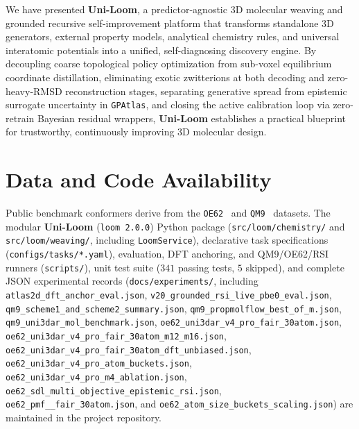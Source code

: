 \documentclass[11pt,a4paper]{article}
\begin{document}
We have presented \textbf{Uni-Loom}, a predictor-agnostic 3D molecular weaving and grounded recursive self-improvement platform that transforms standalone 3D generators, external property models, analytical chemistry rules, and universal interatomic potentials into a unified, self-diagnosing discovery engine. By decoupling coarse topological policy optimization from sub-voxel equilibrium coordinate distillation, eliminating exotic zwitterions at both decoding and zero-heavy-RMSD reconstruction stages, separating generative spread from epistemic surrogate uncertainty in \texttt{GPAtlas}, and closing the active calibration loop via zero-retrain Bayesian residual wrappers, \textbf{Uni-Loom} establishes a practical blueprint for trustworthy, continuously improving 3D molecular design.

\section*{Data and Code Availability}
{\sloppy
Public benchmark conformers derive from the \texttt{OE62}~\cite{stuke2020oe62} and \texttt{QM9}~\cite{ramakrishnan2014qm9} datasets. The modular \textbf{Uni-Loom} (\texttt{loom 2.0.0}) Python package (\texttt{src/loom/\allowbreak chemistry/} and \texttt{src/loom/\allowbreak weaving/}, including \texttt{LoomService}), declarative task specifications (\texttt{configs/\allowbreak tasks/*.yaml}), evaluation, DFT anchoring, and QM9/OE62/RSI runners (\texttt{scripts/}), unit test suite ($341$ passing tests, $5$ skipped), and complete JSON experimental records (\texttt{docs/\allowbreak experiments/}, including \texttt{atlas2d\_\allowbreak dft\_\allowbreak anchor\_\allowbreak eval.json}, \texttt{v20\_\allowbreak grounded\_\allowbreak rsi\_\allowbreak live\_\allowbreak pbe0\_\allowbreak eval.json}, \texttt{qm9\_\allowbreak scheme1\_\allowbreak and\_\allowbreak scheme2\_\allowbreak summary.json}, \texttt{qm9\_\allowbreak propmolflow\_\allowbreak best\_\allowbreak of\_\allowbreak m.json}, \texttt{qm9\_\allowbreak uni3dar\_\allowbreak mol\_\allowbreak benchmark.json}, \texttt{oe62\_\allowbreak uni3dar\_\allowbreak v4\_\allowbreak pro\_\allowbreak fair\_\allowbreak 30atom.json}, \texttt{oe62\_\allowbreak uni3dar\_\allowbreak v4\_\allowbreak pro\_\allowbreak fair\_\allowbreak 30atom\_\allowbreak m12\_\allowbreak m16.json}, \texttt{oe62\_\allowbreak uni3dar\_\allowbreak v4\_\allowbreak pro\_\allowbreak fair\_\allowbreak 30atom\_\allowbreak dft\_\allowbreak unbiased.json}, \texttt{oe62\_\allowbreak uni3dar\_\allowbreak v4\_\allowbreak pro\_\allowbreak atom\_\allowbreak buckets.json}, \texttt{oe62\_\allowbreak uni3dar\_\allowbreak v4\_\allowbreak pro\_\allowbreak m4\_\allowbreak ablation.json}, \texttt{oe62\_\allowbreak sdl\_\allowbreak multi\_\allowbreak objective\_\allowbreak epistemic\_\allowbreak rsi.json}, \texttt{oe62\_\allowbreak pmf\_\allowbreak *\_\allowbreak fair\_\allowbreak 30atom.json}, and \texttt{oe62\_\allowbreak atom\_\allowbreak size\_\allowbreak buckets\_\allowbreak scaling.json}) are maintained in the project repository.\par}

\begingroup
\small
\raggedright

\endgroup
\end{document}
